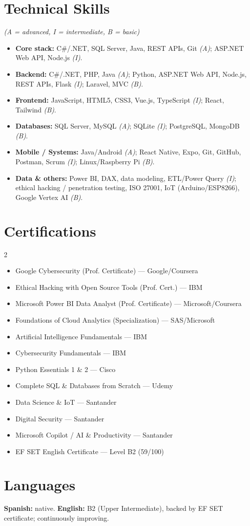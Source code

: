 \documentclass[10pt,a4paper]{article}
\begin{document}
\section{Technical Skills} \textit{\small (A = advanced, I = intermediate, B = basic)}
\begin{itemize}
  \item \textbf{Core stack:} C\#/.NET, SQL Server, Java, REST APIs, Git \textit{(A)}; ASP.NET Web API, Node.js \textit{(I)}.
  \item \textbf{Backend:} C\#/.NET, PHP, Java \textit{(A)}; Python, ASP.NET Web API, Node.js, REST APIs, Flask \textit{(I)}; Laravel, MVC \textit{(B)}.
  \item \textbf{Frontend:} JavaScript, HTML5, CSS3, Vue.js, TypeScript \textit{(I)}; React, Tailwind \textit{(B)}.
  \item \textbf{Databases:} SQL Server, MySQL \textit{(A)}; SQLite \textit{(I)}; PostgreSQL, MongoDB \textit{(B)}.
  \item \textbf{Mobile / Systems:} Java/Android \textit{(A)}; React Native, Expo, Git, GitHub, Postman, Scrum \textit{(I)}; Linux/Raspberry Pi \textit{(B)}.
  \item \textbf{Data \& others:} Power BI, DAX, data modeling, ETL/Power Query \textit{(I)}; ethical hacking / penetration testing, ISO 27001, IoT (Arduino/ESP8266), Google Vertex AI \textit{(B)}.
\end{itemize}

\section{Certifications}
{\small
\begin{multicols}{2}
\begin{itemize}
  \item Google Cybersecurity (Prof. Certificate) --- Google/Coursera
  \item Ethical Hacking with Open Source Tools (Prof. Cert.) --- IBM
  \item Microsoft Power BI Data Analyst (Prof. Certificate) --- Microsoft/Coursera
  \item Foundations of Cloud Analytics (Specialization) --- SAS/Microsoft
  \item Artificial Intelligence Fundamentals --- IBM
  \item Cybersecurity Fundamentals --- IBM
  \item Python Essentials 1 \& 2 --- Cisco
  \item Complete SQL \& Databases from Scratch --- Udemy
  \item Data Science \& IoT --- Santander
  \item Digital Security --- Santander
  \item Microsoft Copilot / AI \& Productivity --- Santander
  \item EF SET English Certificate --- Level B2 (59/100)
\end{itemize}
\end{multicols}}

\section{Languages}
\textbf{Spanish:} native. \qquad \textbf{English:} B2 (Upper Intermediate), backed by EF SET certificate; continuously improving.
\end{document}
